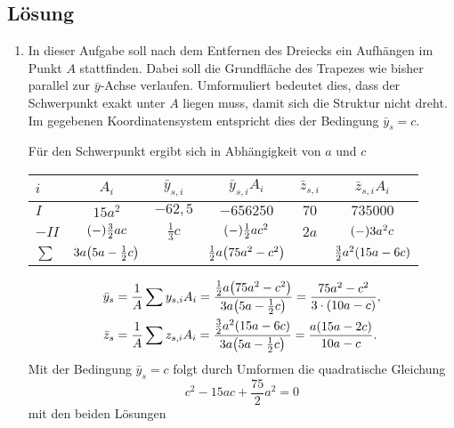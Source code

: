\documentclass{exercise}
\begin{document}
    \subsection*{Lösung}
    \begin{enumerate}
        \item In dieser Aufgabe soll nach dem Entfernen des Dreiecks ein Aufhängen im Punkt \(A\) stattfinden.
        Dabei soll die Grundfläche des Trapezes wie bisher parallel zur \(\bar{y}\)-Achse verlaufen.
        Umformuliert bedeutet dies, dass der Schwerpunkt exakt unter \(A\) liegen muss, damit sich die Struktur nicht dreht.
        Im gegebenen Koordinatensystem entspricht dies der Bedingung \(\bar{y}_s = c\).

        Für den Schwerpunkt ergibt sich in Abhängigkeit von \(a\) und \(c\)
        \begin{center}
            \begin{tabular}{lccccc}
                \toprule
                \(i\) & \(A_i\) & \(\bar{y}_{s, i}\) & \(\bar{y}_{s, i}A_i\) & \(\bar{z}_{s, i}\) & \(\bar{z}_{s, i}A_i\)\\
                \midrule
                \(I\) & \(15a^2\) & \(-62,5\) & \(-656250\) & \(70\) & \(735000\)\\
                \(-II\) & \(\parentheses*{-}\frac{3}{2}ac\) & \(\frac{1}{3}c\) & \(\parentheses*{-}\frac{1}{2}ac^2\) & \(2a\) & \(\parentheses*{-}3a^2 c\)\\
                \midrule
                \(\sum\) & \(3a\parentheses*{5a - \frac{1}{2}c}\) & & \(\frac{1}{2}a\parentheses*{75a^2 - c^2}\) & & \(\frac{3}{2}a^2\parentheses*{15a - 6c}\)\\
                \bottomrule
            \end{tabular}
        \end{center}
        \begin{align*}
            \bar{y}_s &= \frac{1}{A}\sum y_{s, i}A_i = \frac{\frac{1}{2}a\parentheses*{75a^2 - c^2}}{3a\parentheses*{5a - \frac{1}{2}c}} = \frac{75a^2 - c^2}{3 \cdot \parentheses*{10a - c}},\\
            \bar{z}_s &= \frac{1}{A}\sum z_{s, i}A_i = \frac{\frac{3}{2}a^2\parentheses*{15a - 6c}}{3a\parentheses*{5a - \frac{1}{2}c}} = \frac{a\parentheses*{15a - 2c}}{10a - c}.
        \end{align*}
        Mit der Bedingung \(\bar{y}_s = c\) folgt durch Umformen die quadratische Gleichung
        \[
            c^2 - 15ac + \frac{75}{2}a^2 = 0
        \]
        mit den beiden Lösungen

\end{enumerate}
\end{document}
